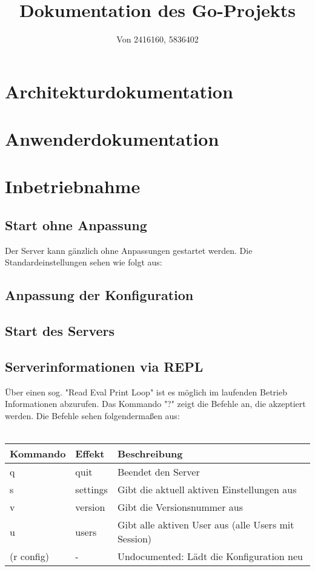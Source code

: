 \documentclass[10pt]{article}
\title{Dokumentation des Go-Projekts}
\author{Von 2416160, 5836402}
\date{}
\begin{document}
\maketitle
	\section{Architekturdokumentation}
	\section{Anwenderdokumentation}
	\section{Inbetriebnahme}
		\subsection{Start ohne Anpassung}
		Der Server kann g\"anzlich ohne Anpassungen gestartet werden.
		Die Standardeinstellungen sehen wie folgt aus:
		\subsection{Anpassung der Konfiguration}
		\subsection{Start des Servers}
		\subsection{Serverinformationen via REPL}
		\"Uber einen sog. "Read Eval Print Loop" ist es m\"oglich im laufenden Betrieb Informationen abzurufen.
		Das Kommando "?" zeigt die Befehle an, die akzeptiert werden. Die Befehle sehen folgenderma{\ss}en aus:\\\\
		\begin{tabular}{l|l|l}
			Kommando   & Effekt   & Beschreibung\\
			\hline
			q          & quit     & Beendet den Server\\
			s          & settings & Gibt die aktuell aktiven Einstellungen aus\\
			v          & version  & Gibt die Versionsnummer aus\\
			u          & users    & Gibt alle aktiven User aus (alle Users mit Session)\\
			(r config) & -        & Undocumented: L\"adt die Konfiguration neu
		\end{tabular}
\end{document}
